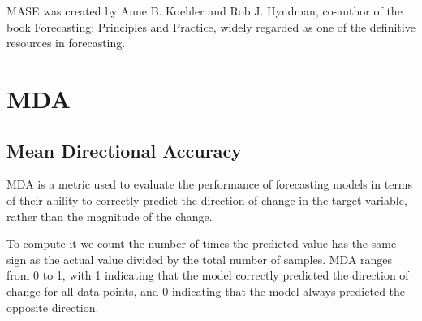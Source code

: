 {}
{MASE was created by Anne B. Koehler and Rob J. Hyndman, co-author of the book Forecasting: Principles and Practice, widely regarded as one of the definitive resources in forecasting.}

\clearpage
\thispagestyle{regressionstyle}
\section{MDA}
\subsection{Mean Directional Accuracy}

MDA is a metric used to evaluate the performance of forecasting models in terms of their ability to correctly predict the direction of change in the target variable,
rather than the magnitude of the change.

\begin{center}
\end{center}

To compute it we count the number of times the predicted value has the same sign as the actual value divided by the total number of samples. MDA ranges from 0 to 1, with 1 indicating
that the model correctly predicted the direction of change for all data points, and 0 indicating that the model
always predicted the opposite direction.

